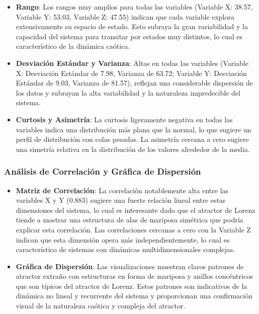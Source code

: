 \documentclass[11pt]{article}
\begin{document}
\begin{itemize}
\item
  \textbf{Rango}: Los rangos muy amplios para todas las variables
  (Variable X: 38.57, Variable Y: 53.03, Variable Z: 47.55) indican que
  cada variable explora extensivamente su espacio de estado. Esto
  subraya la gran variabilidad y la capacidad del sistema para transitar
  por estados muy distintos, lo cual es característico de la dinámica
  caótica.
\item
  \textbf{Desviación Estándar y Varianza}: Altas en todas las variables
  (Variable X: Desviación Estándar de 7.98, Varianza de 63.72; Variable
  Y: Desviación Estándar de 9.03, Varianza de 81.57), reflejan una
  considerable dispersión de los datos y subrayan la alta variabilidad y
  la naturaleza impredecible del sistema.
\item
  \textbf{Curtosis y Asimetría}: La curtosis ligeramente negativa en
  todas las variables indica una distribución más plana que la normal,
  lo que sugiere un perfil de distribución con colas pesadas. La
  asimetría cercana a cero sugiere una simetría relativa en la
  distribución de los valores alrededor de la media.
\end{itemize}

\hypertarget{anuxe1lisis-de-correlaciuxf3n-y-gruxe1fica-de-dispersiuxf3n}{%
\subsubsection{Análisis de Correlación y Gráfica de
Dispersión}\label{anuxe1lisis-de-correlaciuxf3n-y-gruxe1fica-de-dispersiuxf3n}}

\begin{itemize}
\item
  \textbf{Matriz de Correlación}: La correlación notablemente alta entre
  las variables X y Y (0.883) sugiere una fuerte relación lineal entre
  estas dimensiones del sistema, lo cual es interesante dado que el
  atractor de Lorenz tiende a mostrar una estructura de alas de mariposa
  simétrica que podría explicar esta correlación. Las correlaciones
  cercanas a cero con la Variable Z indican que esta dimensión opera más
  independientemente, lo cual es característico de sistemas con
  dinámicas multidimensionales complejas.
\item
  \textbf{Gráfica de Dispersión}: Las visualizaciones muestran claros
  patrones de atractor extraño con estructuras en forma de mariposa y
  anillos concéntricos que son típicos del atractor de Lorenz. Estos
  patrones son indicativos de la dinámica no lineal y recurrente del
  sistema y proporcionan una confirmación visual de la naturaleza
  caótica y compleja del atractor.
\end{itemize}
\end{document}
